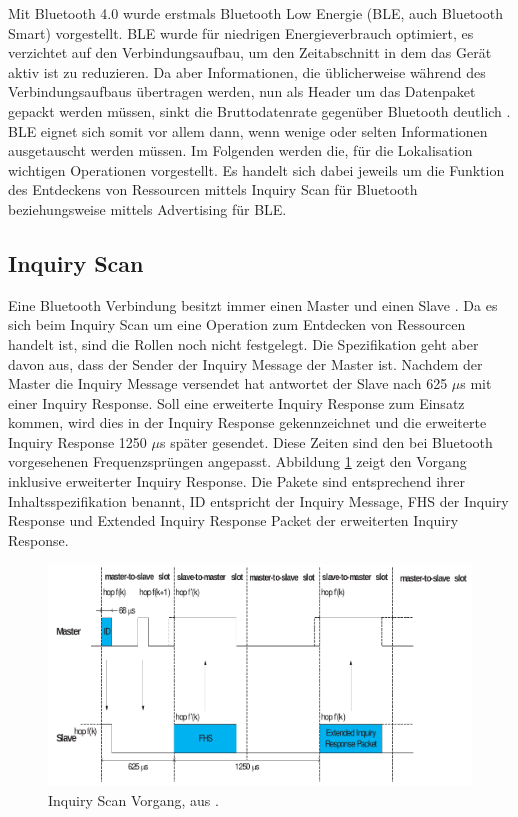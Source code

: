 Mit Bluetooth 4.0 wurde erstmals Bluetooth Low Energie (BLE, auch Bluetooth Smart) vorgestellt.
BLE wurde für niedrigen Energieverbrauch optimiert, es verzichtet auf den Verbindungsaufbau, um den Zeitabschnitt in dem das Gerät aktiv ist zu reduzieren.
Da aber Informationen, die üblicherweise während des Verbindungsaufbaus übertragen werden, nun als Header um das Datenpaket gepackt werden müssen, sinkt die Bruttodatenrate gegenüber Bluetooth deutlich \cite{rigado2016practical}. 
BLE eignet sich somit vor allem dann, wenn wenige oder selten Informationen ausgetauscht werden müssen.
Im Folgenden werden die, für die Lokalisation wichtigen Operationen vorgestellt.
Es handelt sich dabei jeweils um die Funktion des Entdeckens von Ressourcen mittels Inquiry Scan für Bluetooth beziehungsweise mittels Advertising für BLE.

\subsection{Inquiry Scan}
Eine Bluetooth Verbindung besitzt immer einen Master und einen Slave \cite{blue2010inquiry}.
Da es sich beim Inquiry Scan um eine Operation zum Entdecken von Ressourcen handelt ist, sind die Rollen noch nicht festgelegt. 
Die Spezifikation geht aber davon aus, dass der Sender der Inquiry Message der Master ist.
Nachdem der Master die Inquiry Message versendet hat antwortet der Slave nach 625 $\mu$s mit einer Inquiry Response. 
Soll eine erweiterte Inquiry Response zum Einsatz kommen, wird dies in der Inquiry Response gekennzeichnet und die erweiterte Inquiry Response 1250 $\mu$s später gesendet.
Diese Zeiten sind den bei Bluetooth vorgesehenen Frequenzsprüngen angepasst.
Abbildung \ref{fig:inqscan} zeigt den Vorgang inklusive erweiterter Inquiry Response.
Die Pakete sind entsprechend ihrer Inhaltsspezifikation benannt, ID entspricht der Inquiry Message, FHS der Inquiry Response und Extended Inquiry Response Packet der erweiterten Inquiry Response.

\begin{figure}[h]
  \centering
	\includegraphics[width=\textwidth]{images/inqscan.png}
  \caption{Inquiry Scan Vorgang, aus \cite{blue2010inquiry}.}
  \label{fig:inqscan}
\end{figure}

